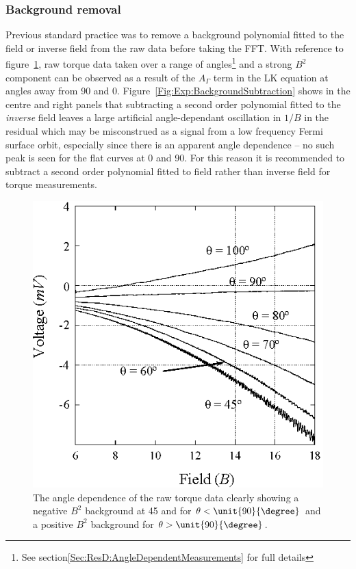 \subsubsection{Background removal}

Previous standard practice was to remove a background polynomial fitted to the field or inverse field from the raw data before taking the \ac{FFT}. With reference to figure~\ref{Fig:Exp:RawPlotAngleDependence}, raw torque data taken over a range of angles\footnote{See section\ref{Sec:ResD:AngleDependentMeasurements} for full details} and a strong $B^2$ component can be observed as a result of the $A_{\Gamma}$ term in the \ac{LK} equation at angles away from \unit{90}{\degree} and \unit{0}{\degree}. Figure~\ref{Fig:Exp:BackgroundSubtraction} shows in the centre and right panels that subtracting a second order polynomial fitted to the \emph{inverse} field leaves a large artificial angle-dependant oscillation in $1/B$ in the residual which may be misconstrued as a signal from a low frequency Fermi surface orbit, especially since there is an apparent angle dependence -- no such peak is seen for the flat curves at \unit{0}{\degree} and \unit{90}{\degree}. For this reason it is recommended to subtract a second order polynomial fitted to field rather than inverse field for torque measurements.
\begin{figure}[htbp]
    \begin{center}
        \includegraphics[scale=1.1]{Chapter-ExperimentalTechnique/Figures/ComparisonBackgroundSubtraction/RawPlotAngleDependence}
        \caption{The angle dependence of the raw torque data clearly showing a negative $B^2$ background at \unit{45}{\degree} and for $\theta<\unit{90}{\degree}$ and a positive $B^2$ background for $\theta>\unit{90}{\degree}$.}
        \label{Fig:Exp:RawPlotAngleDependence}
    \end{center}
\end{figure}
